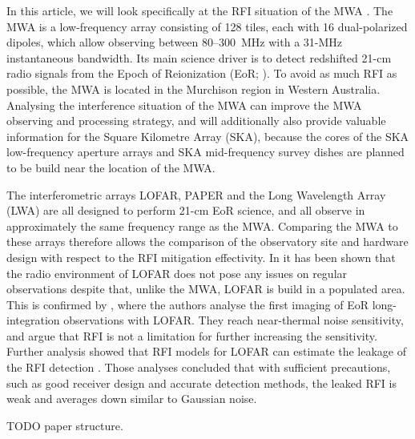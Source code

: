 \documentclass{pasa}
\begin{document}
In this article, we will look specifically at the RFI situation of the MWA \citep{mwa}. The MWA is a low-frequency array consisting of 128 tiles, each with 16 dual-polarized dipoles, which allow observing between 80--300~MHz with a 31-MHz instantaneous bandwidth. Its main science driver is to detect redshifted 21-cm radio signals from the Epoch of Reionization (EoR; \citealt{bowman-science-with-the-mwa-2013}). To avoid as much RFI as possible, the MWA is located in the Murchison region in Western Australia. Analysing the interference situation of the MWA can improve the MWA observing and processing strategy, and will additionally also provide valuable information for the Square Kilometre Array (SKA), because the cores of the SKA low-frequency aperture arrays and SKA mid-frequency survey dishes are planned to be build near the location of the MWA.

The interferometric arrays LOFAR, PAPER and the Long Wavelength Array (LWA) are all designed to perform 21-cm EoR science, and all observe in approximately the same frequency range as the MWA. Comparing the MWA to these arrays therefore allows the comparison of the observatory site and hardware design with respect to the RFI mitigation effectivity. In \citet{lofar-radio-environment} it has been shown that the radio environment of LOFAR does not pose any issues on regular observations despite that, unlike the MWA, LOFAR is build in a populated area. This is confirmed by \citet{ncp-eor-yatawatta}, where the authors analyse the first imaging of EoR long-integration observations with LOFAR. They reach near-thermal noise sensitivity, and argue that RFI is not a limitation for further increasing the sensitivity. Further analysis showed that RFI models for LOFAR can estimate the leakage of the RFI detection \citep{offringa-rfi-distributions}. Those analyses concluded that with sufficient precautions, such as good receiver design and accurate detection methods, the leaked RFI is weak and averages down similar to Gaussian noise.

TODO paper structure.
\end{document}
